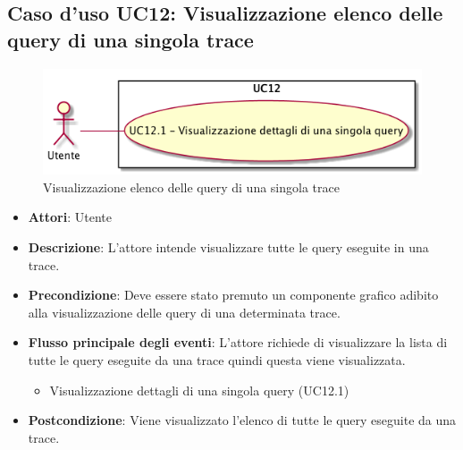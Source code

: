\subsection{Caso d'uso UC12: Visualizzazione elenco delle query di una singola trace}
\begin{figure} [H]
	\centering
	\includegraphics[scale=0.45]{./UC/UC12.png}
	\caption{Visualizzazione elenco delle query di una singola trace}\label{}
\end{figure}
\begin{itemize}
	\item \textbf{Attori}: Utente
	\item \textbf{Descrizione}: L'attore intende visualizzare tutte le query eseguite in una trace.
	\item \textbf{Precondizione}: Deve essere stato premuto un componente grafico adibito alla visualizzazione delle query di una determinata trace.
	\item \textbf{Flusso principale degli eventi}: L'attore richiede di visualizzare la lista di tutte le query eseguite da una trace quindi questa viene visualizzata.
	\begin{itemize}
		\item Visualizzazione dettagli di una singola query (UC12.1)
	\end{itemize}
	\item \textbf{Postcondizione}: Viene visualizzato l'elenco di tutte le query eseguite da una trace.
\end{itemize}

 \hypertarget{UC12.1}{}
